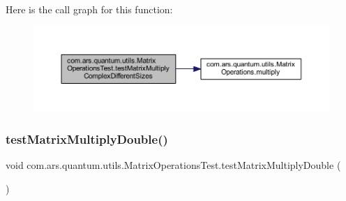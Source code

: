 Here is the call graph for this function\+:\nopagebreak
\begin{figure}[H]
\begin{center}
\leavevmode
\includegraphics[width=350pt]{classcom_1_1ars_1_1quantum_1_1utils_1_1_matrix_operations_test_a9ee4aca46fc14b35d2f779747e609239_cgraph}
\end{center}
\end{figure}
\hypertarget{classcom_1_1ars_1_1quantum_1_1utils_1_1_matrix_operations_test_a32f8097861b74ba4b4ee3d601fcba520}{}\label{classcom_1_1ars_1_1quantum_1_1utils_1_1_matrix_operations_test_a32f8097861b74ba4b4ee3d601fcba520} 
\subsubsection{\texorpdfstring{test\+Matrix\+Multiply\+Double()}{testMatrixMultiplyDouble()}}
{\footnotesize\ttfamily void com.\+ars.\+quantum.\+utils.\+Matrix\+Operations\+Test.\+test\+Matrix\+Multiply\+Double (\begin{DoxyParamCaption}{ }\end{DoxyParamCaption})}

